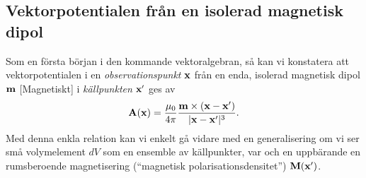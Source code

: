 \subsection{Vektorpotentialen fr{\aa}n en isolerad magnetisk dipol}
Som en f{\"o}rsta b{\"o}rjan i den kommande vektoralgebran, s{\aa} kan vi
konstatera att vektorpotentialen i en {\it observationspunkt} ${\bf x}$
 fr{\aa}n en enda, isolerad magnetisk dipol
${\bf m}$ [Magnetiskt] i {\it k{\"a}llpunkten} ${\bf x}'$
 ges av
$$
  {\bf A}({\bf x})={{\mu_0}\over{4\pi}}
    {{{\bf m}\times({\bf x}-{\bf x}')}\over{|{\bf x}-{\bf x}'|^3}}.
$$
\noindent
Med denna enkla relation kan vi enkelt g{\aa} vidare med en generalisering om
vi ser sm{\aa} volymelement $dV$ som en ensemble av k{\"a}llpunkter, var och
en uppb{\"a}rande en rumsberoende magnetisering (``magnetisk
polarisationsdensitet'') ${\bf M}({\bf x}')$.
\vfill\eject


